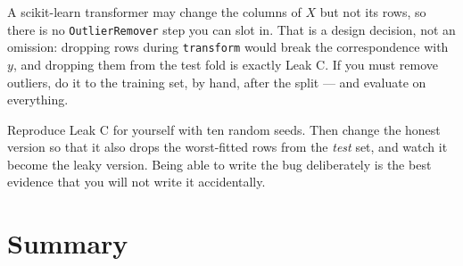 \documentclass[11pt]{article}
\begin{document}
\begin{caution}
A scikit-learn transformer may change the columns of $X$ but not its rows, so
there is no \texttt{OutlierRemover} step you can slot in. That is a design
decision, not an omission: dropping rows during \texttt{transform} would break
the correspondence with $y$, and dropping them from the test fold is exactly
Leak C. If you must remove outliers, do it to the training set, by hand, after
the split --- and evaluate on everything.
\end{caution}

\begin{tryit}
Reproduce Leak C for yourself with ten random seeds. Then change the honest
version so that it also drops the worst-fitted rows from the \emph{test} set,
and watch it become the leaky version. Being able to write the bug deliberately
is the best evidence that you will not write it accidentally.
\end{tryit}

\section{Summary}
\end{document}
